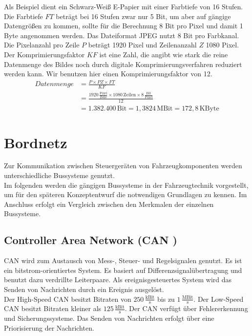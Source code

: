 Als Beispiel dient ein Schwarz-Weiß E-Papier mit einer Farbtiefe von 16 Stufen. Die Farbtiefe $ FT $ beträgt bei 16 Stufen zwar nur 5 Bit, um aber auf gängige Datengrößen zu kommen, sollte für die Berechnung 8 Bit pro Pixel und damit 1 Byte angenommen werden. Das Dateiformat JPEG  nutzt 8 Bit pro Farbkanal. Die Pixelanzahl pro Zeile $ P $ beträgt 1920 Pixel und Zeilenanzahl $ Z $ 1080 Pixel. Der Komprimierungsfaktor $ KF $ ist eine Zahl, die angibt wie stark die reine Datenmenge des Bildes noch durch digitale Komprimierungsverfahren reduziert werden kann. Wir benutzen hier einen Komprimierungsfaktor von 12. \cite[Vgl. Seite 22]{Buhler.2018}
\begin{align}
		Datenmenge &= \frac{P \times PZ \times FT}{KF} \label{eq:Bilddatenmenge}\\
		&= \frac{1920\,\frac{\mathrm{Pixel}}{\mathrm{Zeile}}\times 1080\,\mathrm{Zeilen} \times 8\,\frac{\mathrm{Bit}}{\mathrm{Pixel}}}{12} \\
		&= 1.382.400\,\mathrm{Bit} = 1,3824\,\mathrm{MBit} = 172,8\,\mathrm{KByte}
\end{align}
\section{Bordnetz}
Zur Kommunikation zwischen Steuergeräten von Fahrzeugkomponenten werden unterschiedliche Bussysteme genutzt. \\
Im folgenden werden die gängigen Bussysteme in der Fahrzeugtechnik vorgestellt, um für den späteren Konzeptentwurf die notwendigen Grundlagen zu kennen. Im Anschluss erfolgt ein Vergleich zwischen den Merkmalen der einzelnen Bussysteme.
\subsection{Controller Area Network (CAN )}
CAN wird zum Austausch von Mess-, Steuer- und Regelsignalen genutzt. Es ist ein bitstrom-orientiertes System. Es basiert auf Differenzsignalübertragung und benutzt dazu verdrillte Leiterpaare. Als ereignisgesteuertes System wird das Senden von Nachrichten durch ein Ereignis ausgelöst. \\
Der High-Speed CAN besitzt Bitraten von $ 250\,\frac{\mathrm{kBit}}{\mathrm{s}} $ bis zu $ 1\,\frac{\mathrm{MBit}}{\mathrm{s}}$.
Der Low-Speed CAN besitzt Bitraten kleiner als $ 125\,\frac{\mathrm{kBit}}{\mathrm{s}} $. 
Der CAN verfügt über Fehlererkennung und Sicherungssysteme. Das Senden von Nachrichten erfolgt über eine Priorisierung der Nachrichten. \cite[Vgl. Seite 57 ff.]{Zimmermann.2014}
